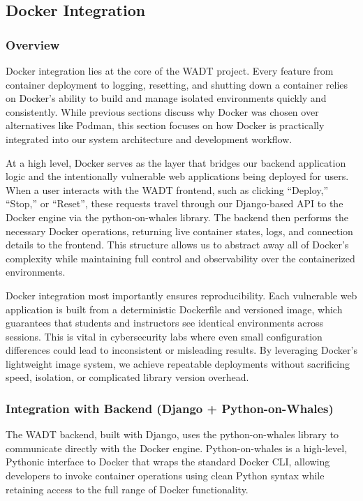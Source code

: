\documentclass[12pt,titlepage]{article}
\begin{document}
\subsection{Docker Integration}

\subsubsection{Overview}
Docker integration lies at the core of the WADT project. Every feature from container deployment to logging, resetting, and shutting down a container relies on Docker’s ability to build and manage isolated environments quickly and consistently. While previous sections discuss why Docker was chosen over alternatives like Podman, this section focuses on how Docker is practically integrated into our system architecture and development workflow.

At a high level, Docker serves as the layer that bridges our backend application logic and the intentionally vulnerable web applications being deployed for users. When a user interacts with the WADT frontend, such as clicking “Deploy,” “Stop,” or “Reset”, these requests travel through our Django-based API to the Docker engine via the python-on-whales library. The backend then performs the necessary Docker operations, returning live container states, logs, and connection details to the frontend. This structure allows us to abstract away all of Docker’s complexity while maintaining full control and observability over the containerized environments.

Docker integration most importantly ensures reproducibility. Each vulnerable web application is built from a deterministic Dockerfile and versioned image, which guarantees that students and instructors see identical environments across sessions. This is vital in cybersecurity labs where even small configuration differences could lead to inconsistent or misleading results. By leveraging Docker’s lightweight image system, we achieve repeatable deployments without sacrificing speed, isolation, or complicated library version overhead.


\subsubsection{Integration with Backend (Django + Python-on-Whales)}
The WADT backend, built with Django, uses the python-on-whales library to communicate directly with the Docker engine. Python-on-whales is a high-level, Pythonic interface to Docker that wraps the standard Docker CLI, allowing developers to invoke container operations using clean Python syntax while retaining access to the full range of Docker functionality. 
\end{document}
